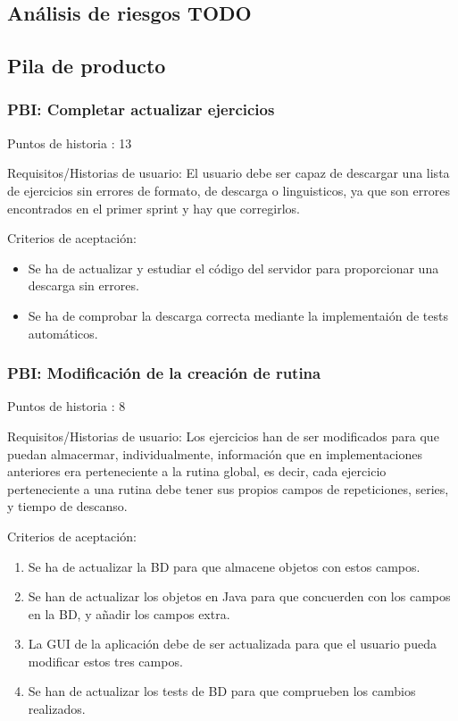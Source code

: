 \documentclass[11pt,a4paper]{report}
\begin{document}
\subsection{Análisis de riesgos TODO}
\subsection{Pila de producto}
\subsubsection{PBI: Completar actualizar ejercicios}
Puntos de historia : 13

Requisitos/Historias de usuario: El usuario debe ser capaz de descargar una lista de ejercicios sin errores de formato, de descarga o linguisticos, ya que son errores encontrados en el primer sprint y hay que corregirlos.

Criterios de aceptación:
\begin{itemize}
	\item Se ha de actualizar y estudiar el código del servidor para proporcionar una descarga sin errores.
	
	\item Se ha de comprobar la descarga correcta mediante la implementaión de tests automáticos.
	
\end{itemize}
\subsubsection{PBI: Modificación de la creación de rutina}
Puntos de historia : 8

Requisitos/Historias de usuario: Los ejercicios han de ser modificados para que puedan almacermar, individualmente, información que en implementaciones anteriores era perteneciente a la rutina global, es decir, cada ejercicio perteneciente a una rutina debe tener sus propios campos de repeticiones, series, y tiempo de descanso.

Criterios de aceptación:
\begin{enumerate}
	\item Se ha de actualizar la BD para que almacene objetos con estos campos.
	
	\item Se han de actualizar los objetos en Java para que concuerden con los campos en la BD, y añadir los campos extra.
	
	\item La GUI de la aplicación debe de ser actualizada para que el usuario pueda modificar estos tres campos.
	
	\item Se han de actualizar los tests de BD para que comprueben los cambios realizados.
	
\end{enumerate}
\end{document}
